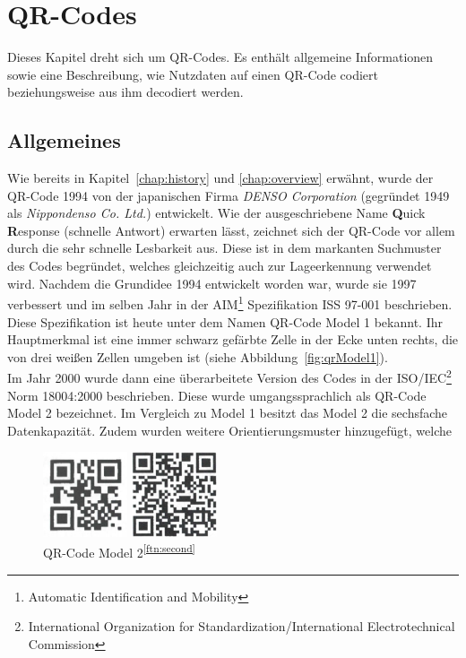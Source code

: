 \section{QR-Codes}\label{chap:qrcodes}
Dieses Kapitel dreht sich um QR-Codes. Es enthält allgemeine Informationen sowie eine Beschreibung, wie Nutzdaten auf einen QR-Code codiert beziehungsweise aus ihm decodiert werden.

\subsection{Allgemeines}
Wie bereits in Kapitel~\ref{chap:history} und \ref{chap:overview} erwähnt, wurde der QR-Code 1994 von der japanischen Firma \textit{DENSO Corporation} (gegründet 1949 als \textit{Nippondenso Co. Ltd.}) entwickelt. Wie der ausgeschriebene Name \textbf{Q}uick \textbf{R}esponse (schnelle Antwort) erwarten lässt, zeichnet sich der QR-Code vor allem durch die sehr schnelle Lesbarkeit aus. Diese ist in dem markanten Suchmuster des Codes begründet, welches gleichzeitig auch zur Lageerkennung verwendet wird.
Nachdem die Grundidee 1994 entwickelt worden war, wurde sie 1997 verbessert und im selben Jahr in der AIM\footnote{Automatic Identification and Mobility} Spezifikation ISS 97-001 beschrieben. Diese Spezifikation ist heute unter dem Namen QR-Code Model 1 bekannt. Ihr Hauptmerkmal ist eine immer schwarz gefärbte Zelle in der Ecke unten rechts, die von drei weißen Zellen umgeben ist (siehe Abbildung~\ref{fig:qrModel1}).\\
Im Jahr 2000 wurde dann eine überarbeitete Version des Codes in der ISO/IEC\footnote{International Organization for Standardization/International Electrotechnical Commission} Norm 18004:2000 beschrieben. Diese wurde umgangssprachlich als QR-Code Model 2 bezeichnet. Im Vergleich zu Model 1 besitzt das Model 2 die sechsfache Datenkapazität. Zudem wurden weitere Orientierungsmuster hinzugefügt, welche \\
\begin{figure}[htbp]
	\parbox{.47\textwidth}
	{
		\centering
		\includegraphics[height=2.5cm]{Bilder/QR_Code_Model_1.png}
		\caption[QR-Code Model 1]{QR-Code Model 1\footnotemark}
		\label{fig:qrModel1}
	}
	\hfill
	\parbox{.47\textwidth}
	{
		\centering
		\includegraphics[height=2.5cm]{Bilder/QR_Code_Model_2.png}
		\caption[QR-Code Model 2]{QR-Code Model 2\textsuperscript{\ref{ftn:second}}}
		\label{fig:qrModel2}
	}
	\hfill
\end{figure}
